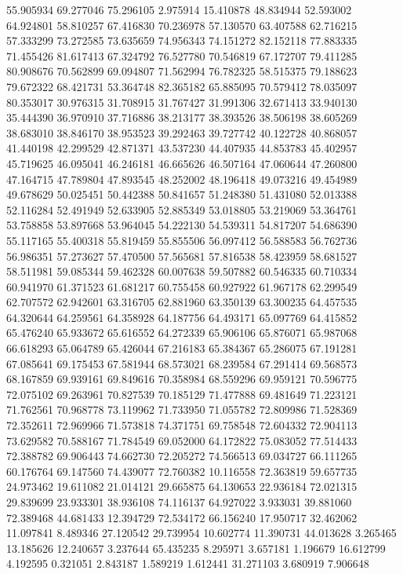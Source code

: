 55.905934
69.277046
75.296105
2.975914
15.410878
48.834944
52.593002
64.924801
58.810257
67.416830
70.236978
57.130570
63.407588
62.716215
57.333299
73.272585
73.635659
74.956343
74.151272
82.152118
77.883335
71.455426
81.617413
67.324792
76.527780
70.546819
67.172707
79.411285
80.908676
70.562899
69.094807
71.562994
76.782325
58.515375
79.188623
79.672322
68.421731
53.364748
82.365182
65.885095
70.579412
78.035097
80.353017
30.976315
31.708915
31.767427
31.991306
32.671413
33.940130
35.444390
36.970910
37.716886
38.213177
38.393526
38.506198
38.605269
38.683010
38.846170
38.953523
39.292463
39.727742
40.122728
40.868057
41.440198
42.299529
42.871371
43.537230
44.407935
44.853783
45.402957
45.719625
46.095041
46.246181
46.665626
46.507164
47.060644
47.260800
47.164715
47.789804
47.893545
48.252002
48.196418
49.073216
49.454989
49.678629
50.025451
50.442388
50.841657
51.248380
51.431080
52.013388
52.116284
52.491949
52.633905
52.885349
53.018805
53.219069
53.364761
53.758858
53.897668
53.964045
54.222130
54.539311
54.817207
54.686390
55.117165
55.400318
55.819459
55.855506
56.097412
56.588583
56.762736
56.986351
57.273627
57.470500
57.565681
57.816538
58.423959
58.681527
58.511981
59.085344
59.462328
60.007638
59.507882
60.546335
60.710334
60.941970
61.371523
61.681217
60.755458
60.927922
61.967178
62.299549
62.707572
62.942601
63.316705
62.881960
63.350139
63.300235
64.457535
64.320644
64.259561
64.358928
64.187756
64.493171
65.097769
64.415852
65.476240
65.933672
65.616552
64.272339
65.906106
65.876071
65.987068
66.618293
65.064789
65.426044
67.216183
65.384367
65.286075
67.191281
67.085641
69.175453
67.581944
68.573021
68.239584
67.291414
69.568573
68.167859
69.939161
69.849616
70.358984
68.559296
69.959121
70.596775
72.075102
69.263961
70.827539
70.185129
71.477888
69.481649
71.223121
71.762561
70.968778
73.119962
71.733950
71.055782
72.809986
71.528369
72.352611
72.969966
71.573818
74.371751
69.758548
72.604332
72.904113
73.629582
70.588167
71.784549
69.052000
64.172822
75.083052
77.514433
72.388782
69.906443
74.662730
72.205272
74.566513
69.034727
66.111265
60.176764
69.147560
74.439077
72.760382
10.116558
72.363819
59.657735
24.973462
19.611082
21.014121
29.665875
64.130653
22.936184
72.021315
29.839699
23.933301
38.936108
74.116137
64.927022
3.933031
39.881060
72.389468
44.681433
12.394729
72.534172
66.156240
17.950717
32.462062
11.097841
8.489346
27.120542
29.739954
10.602774
11.390731
44.013628
3.265465
13.185626
12.240657
3.237644
65.435235
8.295971
3.657181
1.196679
16.612799
4.192595
0.321051
2.843187
1.589219
1.612441
31.271103
3.680919
7.906648
